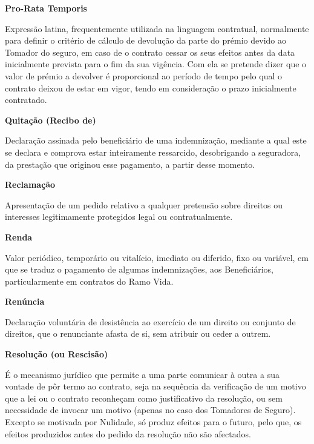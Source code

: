 \begin{description}
\item \textbf{Pro-Rata Temporis}

Expressão latina, frequentemente utilizada na linguagem contratual, normalmente para definir o critério de cálculo de devolução da parte do prémio devido ao Tomador do seguro, em caso de o contrato cessar os seus efeitos antes da data inicialmente prevista para o fim da sua vigência. Com ela se pretende dizer que o valor de prémio a devolver é proporcional ao período de tempo pelo qual o contrato deixou de estar em vigor, tendo em consideração o prazo inicialmente contratado.
\end{description}

\begin{description}
\item \textbf{Quitação (Recibo de)}

Declaração assinada pelo beneficiário de uma indemnização, mediante a qual este se declara e comprova estar inteiramente ressarcido, desobrigando a seguradora, da prestação que originou esse pagamento, a partir desse momento.
\end{description}

\begin{description}
\item \textbf{Reclamação}

Apresentação de um pedido relativo a qualquer pretensão sobre direitos ou interesses legitimamente protegidos legal ou contratualmente.
\end{description}

\begin{description}
\item \textbf{Renda}

Valor periódico, temporário ou vitalício, imediato ou diferido, fixo ou variável, em que se traduz o pagamento de algumas indemnizações, aos Beneficiários, particularmente em contratos do Ramo Vida.
\end{description}

\begin{description}
\item \textbf{Renúncia}

Declaração voluntária de desistência ao exercício de um direito ou conjunto de direitos, que o renunciante afasta de si, sem atribuir ou ceder a outrem.
\end{description}

\begin{description}
\item \textbf{Resolução (ou Rescisão)}

É o mecanismo jurídico que permite a uma parte comunicar à outra a sua vontade de pôr termo ao contrato, seja na sequência da verificação de um motivo que a lei ou o contrato reconheçam como justificativo da resolução, ou sem necessidade de invocar um motivo (apenas no caso dos Tomadores de Seguro). Excepto se motivada por Nulidade, só produz efeitos para o futuro, pelo que, os efeitos produzidos antes do pedido da resolução não são afectados.
\end{description}

